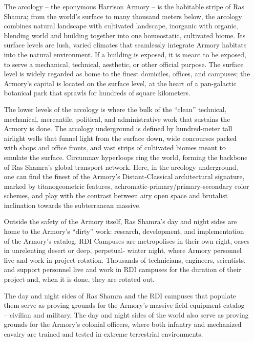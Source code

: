 The arcology -- the eponymous Harrison Armory -- is the habitable stripe of Ras Shamra; from the  
world’s surface to many thousand meters below, the arcology combines natural landscape with  
cultivated landscape, inorganic with organic, blending world and building together into one  
homeostatic, cultivated biome. Its surface levels are lush, varied climates that seamlessly  
integrate Armory habitats into the natural environment. If a building is exposed, it is meant to be  
exposed, to serve a mechanical, technical, aesthetic, or other official purpose. The surface level is  
widely regarded as home to the finest domiciles, offices, and campuses; the Armory’s capital is  
located on the surface level, at the heart of a pan-galactic botanical park that sprawls for  
hundreds of square kilometers.   

The lower levels of the arcology is where the bulk of the “clean” technical, mechanical, mercantile,  
political, and administrative work that sustains the Armory is done. The arcology underground is  
defined by hundred-meter tall airlight wells that funnel light from the surface down, wide  
concourses packed with shops and office fronts, and vast strips of cultivated biomes meant to  
emulate the surface. Circumnav hyperloops ring the world, forming the backbone of Ras  
Shamra’s global transport network. Here, in the arcology underground, one can find the finest of  
the Armory’s Distant-Classical architectural signature, marked by titanogeometric features,  
achromatic-primary/primary-secondary color schemes, and play with the contrast between airy  
open space and brutalist inclination towards the subterranean massive.   

Outside the safety of the Armory itself, Ras Shamra’s day and night sides are home to the  
Armory’s “dirty” work: research, development, and implementation of the Armory’s catalog. RDI  
Campuses are metropolises in their own right, oases in unrelenting desert or deep, perpetual- 
winter night, where Armory personnel live and work in project-rotation. Thousands of technicians,  
engineers, scientists, and support personnel live and work in RDI campuses for the duration of  
their project and, when it is done, they are rotated out.   

                                                                                                           


The day and night sides of Ras Shamra and the RDI campuses that populate them serve as  
proving grounds for the Armory’s massive field equipment catalog -- civilian and military. The day  
and night sides of the world also serve as proving grounds for the Armory’s colonial officers,  
where both infantry and mechanized cavalry are trained and tested in extreme terrestrial  
environments.    

